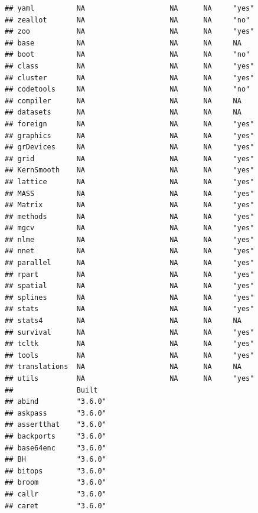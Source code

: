 \documentclass[]{article}
\begin{document}
\begin{verbatim}
## yaml          NA                    NA      NA     "yes"           
## zeallot       NA                    NA      NA     "no"            
## zoo           NA                    NA      NA     "yes"           
## base          NA                    NA      NA     NA              
## boot          NA                    NA      NA     "no"            
## class         NA                    NA      NA     "yes"           
## cluster       NA                    NA      NA     "yes"           
## codetools     NA                    NA      NA     "no"            
## compiler      NA                    NA      NA     NA              
## datasets      NA                    NA      NA     NA              
## foreign       NA                    NA      NA     "yes"           
## graphics      NA                    NA      NA     "yes"           
## grDevices     NA                    NA      NA     "yes"           
## grid          NA                    NA      NA     "yes"           
## KernSmooth    NA                    NA      NA     "yes"           
## lattice       NA                    NA      NA     "yes"           
## MASS          NA                    NA      NA     "yes"           
## Matrix        NA                    NA      NA     "yes"           
## methods       NA                    NA      NA     "yes"           
## mgcv          NA                    NA      NA     "yes"           
## nlme          NA                    NA      NA     "yes"           
## nnet          NA                    NA      NA     "yes"           
## parallel      NA                    NA      NA     "yes"           
## rpart         NA                    NA      NA     "yes"           
## spatial       NA                    NA      NA     "yes"           
## splines       NA                    NA      NA     "yes"           
## stats         NA                    NA      NA     "yes"           
## stats4        NA                    NA      NA     NA              
## survival      NA                    NA      NA     "yes"           
## tcltk         NA                    NA      NA     "yes"           
## tools         NA                    NA      NA     "yes"           
## translations  NA                    NA      NA     NA              
## utils         NA                    NA      NA     "yes"           
##               Built  
## abind         "3.6.0"
## askpass       "3.6.0"
## assertthat    "3.6.0"
## backports     "3.6.0"
## base64enc     "3.6.0"
## BH            "3.6.0"
## bitops        "3.6.0"
## broom         "3.6.0"
## callr         "3.6.0"
## caret         "3.6.0"

\end{verbatim}
\end{document}
